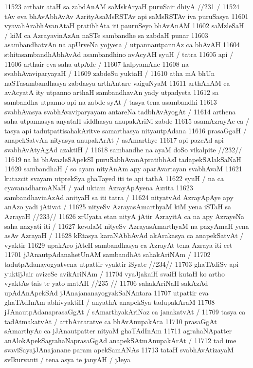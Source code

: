 11523 	arthair ataH sa zabdAnAM saMskAryaH puruSair dhiyA //231  /  
11524 tAv eva bhAvAbhAvAv AzrityAsaMsRSTAv api saMsRSTAv iva puruSasya
11601 vyavahArabhAvanAtaH pratibhAta iti pauruSeyo bhAvAnAM 
11602 saMzleSaH / kiM ca AzrayavinAzAn naSTe sambandhe sa zabdaH punar
11603 asambandhatvAn na apUrveNa yojyeta / utpannautpannAz ca bhAvAH
11604 sthitasambandhAbhAvAd asambandhino avAcyAH syuH / tatra
11605 api /
11606 	arthair eva saha utpAde /
11607 kalpyamAne
11608 	na svabhAvaviparyayaH /  
11609 	zabdeSu yuktaH / 
11610 atha mA bhUn naSTasambandhasya zabdasya arthAntare vaiguNyaM
11611 arthAnAM ca avAcyatA ity utpanno arthaH sambandhavAn yady utpadyeta  
11612 sa sambandha utpanno api na zabde syAt / tasya tena asambandhi 
11613 svabhAvasya svabhAvaviparyayam antareNa tadbhAvAyogAt /  
11614 arthena saha utpannasya anyataH siddhasya anupakAriNi zabde  
11615 asamAzrayAc ca / tasya api tadutpattisahakAritve samarthasya nityautpAdana
11616 prasaGgaH / anapekSatvAn nityasya anupakArAt / asAmarthye 
11617 api pazcAd api svabhAvAtyAgAd azaktiH /  
11618 	sambandhe na ayaM doSo vikalpite //232//  
11619 na hi bhAvazleSApekSI puruSabhAvanApratibhAsI tadapekSAlakSaNaH
11620 sambandhaH / so ayam nityAnAm apy aparAvartayan svabhAvaM 
11621 kutazcit svayam utprekSya ghaTayed iti te api tathA 
11622 syuH / na ca cyavanadharmANaH / yad uktam AzrayApAyena Azrita  
11623 sambandhavinAzAd anityaH sa iti tatra /  
11624 	nityatvAd AzrayApAye apy anAzo yadi jAtivat / 
11625 	nityeSv AzrayasAmarthyaM kiM yena iSTaH sa AzrayaH //233// 
11626 zrUyata etan nityA jAtir AzrayitA ca na apy AzrayeNa saha nazyati iti /
11627 kevalaM nityeSv AzrayasAmarthyaM na pazyAmaH yena asAv AzrayaH / 
11628 kRtasya karaNAbhAvAd akArakasya ca anapekSatvAt / vyaktir  
11629 upakAro jAteH sambandhasya ca AzrayAt tena Azraya iti cet
11701 	jJAnautpAdanahetUnAM sambandhAt sahakAriNAm /
11702 	tadutpAdanayogyatvena utpattir vyaktir iSyate //234// 
11703 	ghaTAdiSv api yuktijJair avizeSe avikAriNAm /
11704 	vyaJjakaiH svaiH kutaH ko artho vyaktAs tais te yato matAH //235 //
11706 sahakAriNaH sakAzAd upAdAnApekSAd jJAnajananayogyakSaNAntara
11707 utpattir eva ghaTAdInAm abhivyaktiH / anyathA anapekSya tadupakAraM
11708 jJAnautpAdanaprasaGgAt / sAmarthyakAriNaz ca janakatvAt /  
11709 tasya ca tadAtmakatvAt / arthAntaratve ca bhAvAnupakAra  
11710 prasaGgAt sAmarthyAc ca jJAnautpatter nityaM ghaTAdInAm
11711 agrahaNApatter anAlokApekSagrahaNaprasaGgAd anapekSAtmAnupakArAt /
11712 tad ime svaviSayajJAnajanane param apekSamANAs 
11713 tataH svabhAvAtizayaM svIkurvanti / tena asya te janyAH / jJeya  
